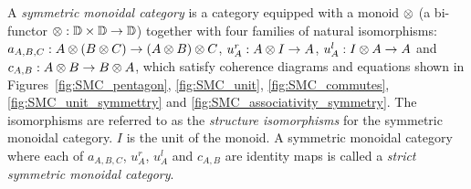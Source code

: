 \begin{definition}\label{symmetricmonoidalcat}
  A \emph{symmetric monoidal category}\cite{barr:ctcs,maclan97:categorieswrkmath} \cD{} is a
  category equipped with a monoid $\otimes$ (a bi-functor $\otimes:\mathbb{D} \times \mathbb{D} \to \mathbb{D}$) together with
  four families of natural isomorphisms:  $a_{A,B,C}:A\otimes(B\otimes C) \to (A\otimes B)\otimes C$, $u^r_{A}:A\otimes I\to A$,
  $u^l_{A}:I\otimes A \to A$ and $c_{A,B}:A\otimes B \to B\otimes A$, which satisfy coherence diagrams and
  equations shown in Figures~\ref{fig:SMC_pentagon}, \ref{fig:SMC_unit}, \ref{fig:SMC_commutes},
  \ref{fig:SMC_unit_symmettry} and \ref{fig:SMC_associativity_symmetry}. The isomorphisms are
  referred to as the \emph{structure isomorphisms}  for the symmetric monoidal category. $I$ is the
  unit of the monoid. A symmetric monoidal category where each of $a_{A,B,C}$, $u^r_{A}$, $u^l_{A}$
  and $c_{A,B}$ are identity maps is called a \emph{strict symmetric monoidal category}.
\end{definition}

